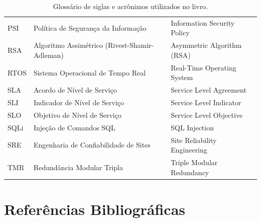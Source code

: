 \documentclass[12pt,a4paper,twoside]{report}
\begin{document}
\begin{table}[ht]
\begin{tabular}{lp{5.5cm}p{6cm}}
        PSI    & Política de Segurança da Informação       & Information Security Policy \\
        RSA    & Algoritmo Assimétrico (Rivest-Shamir-Adleman) & Asymmetric Algorithm (RSA) \\
        RTOS   & Sistema Operacional de Tempo Real          & Real-Time Operating System \\
        SLA    & Acordo de Nível de Serviço                & Service Level Agreement \\
        SLI    & Indicador de Nível de Serviço             & Service Level Indicator \\
        SLO    & Objetivo de Nível de Serviço              & Service Level Objective \\
        SQLi   & Injeção de Comandos SQL                   & SQL Injection \\
        SRE    & Engenharia de Confiabilidade de Sites      & Site Reliability Engineering \\
        TMR    & Redundância Modular Tripla                & Triple Modular Redundancy \\
        \bottomrule
    \end{tabular}
    \caption{Glossário de siglas e acrônimos utilizados no livro.}
\end{table}



\chapter*{Referências Bibliográficas}
\printbibliography[heading=none]
\end{document}
